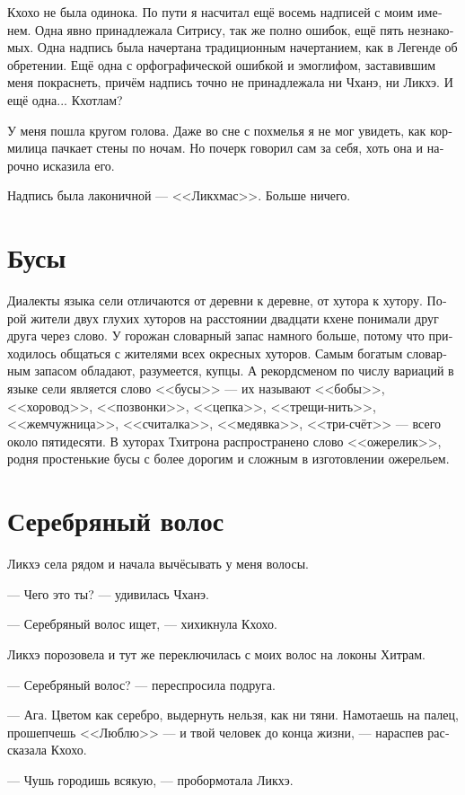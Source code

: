 \documentclass[a4paper,12pt,fleqn]{book}\usepackage{polyglossia}\setdefaultlanguage[babelshorthands=true]{russian}\setotherlanguage{english}\defaultfontfeatures{Ligatures=TeX,Mapping=tex-text}\usepackage{xcolor}\newcommand{\ml}[3]{#2}
\begin{document}
{Кхохо не была одинока.
По пути я насчитал ещё восемь надписей с моим именем.
Одна явно принадлежала Ситрису, так же полно ошибок, ещё пять незнакомых.
Одна надпись была начертана традиционным начертанием, как в Легенде об обретении.
Ещё одна с орфографической ошибкой и эмоглифом, заставившим меня покраснеть, причём надпись точно не принадлежала ни Чханэ, ни Ликхэ.
И ещё одна... Кхотлам?

У меня пошла кругом голова.
Даже во сне с похмелья я не мог увидеть, как кормилица пачкает стены по ночам.
Но почерк говорил сам за себя, хоть она и нарочно исказила его.

Надпись была лаконичной --- <<Ликхмас>>.
Больше ничего.

\section{Бусы}

Диалекты языка сели отличаются от деревни к деревне, от хутора к хутору.
Порой жители двух глухих хуторов на расстоянии двадцати кхене понимали друг друга через слово.
У горожан словарный запас намного больше, потому что приходилось общаться с жителями всех окресных хуторов.
Самым богатым словарным запасом обладают, разумеется, купцы.
А рекордсменом по числу вариаций в языке сели является слово <<бусы>> --- их называют <<бобы>>, <<хоровод>>, <<позвонки>>, <<цепка>>, <<трещи-нить>>, <<жемчужница>>, <<считалка>>, <<медявка>>, <<три-счёт>> --- всего около пятидесяти.
В хуторах Тхитрона распространено слово <<ожерелик>>, родня простенькие бусы с более дорогим и сложным в изготовлении ожерельем.

\section{Серебряный волос}

Ликхэ села рядом и начала вычёсывать у меня волосы.

--- Чего это ты? --- удивилась Чханэ.

--- Серебряный волос ищет, --- хихикнула Кхохо.

Ликхэ порозовела и тут же переключилась с моих волос на локоны Хитрам.

--- Серебряный волос? --- переспросила подруга.

--- Ага.
Цветом как серебро, выдернуть нельзя, как ни тяни.
Намотаешь на палец, прошепчешь <<Люблю>> --- и твой человек до конца жизни, --- нараспев рассказала Кхохо.

--- Чушь городишь всякую, --- пробормотала Ликхэ.

}
\end{document}
